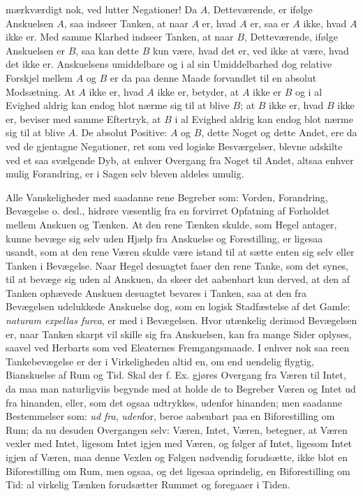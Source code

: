 \documentclass[11pt]{book}
\newcommand{\opage}[1]{\marginnote{\footnotesize\textit{[#1]}}}
\begin{document}
mærkværdigt nok, ved lutter Negationer! Da $A$, Detteværende, er
ifølge Anskuelsen $A$, saa indseer Tanken, at naar
\opage{18} \setcounter{footnote}{0}%
$A$ er, hvad $A$ er, saa er $A$ ikke, hvad $A$ ikke er. Med samme
Klarhed indseer Tanken, at naar $B$, Detteværende, ifølge Anskuelsen
er $B$, saa kan dette $B$ kun være, hvad det er, ved ikke at være,
hvad det ikke er. Anskuelsens umiddelbare og i al sin Umiddelbarhed
dog relative Forskjel mellem $A$ og $B$ er da paa denne Maade
forvandlet til en absolut Modsætning. At $A$ ikke er, hvad $A$ ikke
er, betyder, at $A$ ikke er $B$ og i al Evighed aldrig kan endog blot
nærme sig til at blive $B$; at $B$ ikke er, hvad $B$ ikke er, beviser
med samme Eftertryk, at $B$ i al Evighed aldrig kan endog blot nærme
sig til at blive $A$. De absolut Positive: $A$ og $B$, dette Noget og
dette Andet, ere da ved de gjentagne Negationer, ret som ved logiske
Besværgelser, blevne adskilte ved et saa svælgende Dyb, at enhver
Overgang fra Noget til Andet, altsaa enhver mulig Forandring, er i
Sagen selv bleven aldeles umulig.

Alle Vanskeligheder med saadanne rene Begreber som: Vorden,
Forandring, Bevægelse o. desl., hidrøre væsentlig fra en forvirret
Opfatning af Forholdet mellem Anskuen og Tænken. At den rene Tænken
skulde, som Hegel antager, kunne bevæge sig selv uden Hjælp fra
Anskuelse og Forestilling, er ligesaa usandt, som at den rene Væren
skulde være istand til at sætte enten sig selv eller Tanken i
Bevægelse. Naar Hegel desuagtet faaer den rene Tanke, som det synes,
til at bevæge sig uden al Anskuen, da skeer det aabenbart kun derved,
at den af Tanken ophævede Anskuen desuagtet bevares i Tanken, saa at
den fra Bevægelsen udelukkede Anskuelse dog, som en logisk
Stadfæstelse af det Gamle: \textit{naturam expellas furca}, er med i
Bevægelsen. Hvor utænkelig derimod Bevægelsen er, naar Tanken skarpt
vil skille sig fra Anskuelsen, kan fra mange Sider oplyses, saavel
ved Herbarts som ved Eleaternes Fremgangsmaade. I enhver nok saa reen
Tankebevægelse er der i Virkeligheden altid en, om end uendelig
flygtig, Bianskuelse af Rum og Tid. Skal der
\opage{19} \setcounter{footnote}{0}%
f. Ex. gjøres Overgang fra Væren til Intet, da maa man naturligviis
begynde med at holde de to Begreber Væren og Intet ud fra hinanden,
eller, som det ogsaa udtrykkes, udenfor hinanden; men saadanne
Bestemmelser som: \emph{ud fra}, \emph{uden}for, beroe aabenbart paa
en Biforestilling om Rum; da nu desuden Overgangen selv: Væren,
Intet, Væren, betegner, at Væren vexler med Intet, ligesom Intet
igjen med Væren, og følger af Intet, ligesom Intet igjen af Væren,
maa denne Vexlen og Følgen nødvendig forudsætte, ikke blot en
Biforestilling om Rum, men ogsaa, og det ligesaa oprindelig, en
Biforestilling om Tid: al virkelig Tænken forudsætter Rummet og
foregaaer i Tiden.
\end{document}
